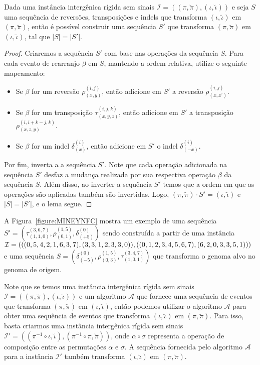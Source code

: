 \begin{lemma}\label{lemma:UWWIFTBQ}
Dada uma instância intergênica rígida sem sinais $\mathcal{I}=((\pi,\breve\pi),(\iota,\breve\iota))$ e seja $S$ uma sequência de reversões, transposições e indels que transforma $(\iota,\breve\iota)$ em $(\pi,\breve\pi)$, então é possível construir uma sequência $S'$ que transforma $(\pi,\breve\pi)$ em $(\iota,\breve\iota)$, tal que $|S| = |S'|$.
\end{lemma}
\begin{proof}
Criaremos a sequência $S'$ com base nas operações da sequência $S$. Para cada evento de rearranjo $\beta$ em $S$, mantendo a ordem relativa, utilize o seguinte mapeamento:
\begin{itemize}
  \item Se $\beta$ for um reversão $\rho^{(i,j)}_{(x,y)}$, então adicione em $S'$ a reversão $\rho^{(i,j)}_{(x,x^{\prime})}$.
  \item Se $\beta$ for um transposição $\tau^{(i,j,k)}_{(x,y,z)}$, então adicione em $S'$ a transposição $\rho^{(i,i+k-j,k)}_{(x,z,y)}$.
  \item Se $\beta$ for um indel $\delta^{(i)}_{(x)}$, então adicione em $S'$ o indel $\delta^{(i)}_{(-x)}$. 
\end{itemize}  
Por fim, inverta a a sequência $S'$. Note que cada operação adicionada na sequência $S'$ desfaz a mudança realizada por sua respectiva operação $\beta$ da sequência $S$. Além disso, ao inverter a sequência $S'$ temos que a ordem em que as operações são aplicadas também são invertidas. Logo, $(\pi,\breve\pi) \cdot S' = (\iota,\breve\iota)$ e $|S| = |S'|$, e o lema segue.
\end{proof}

A Figura~\ref{figure:MINEYNFC} mostra um exemplo de uma sequência $S'=(\tau^{(3,6,7)}_{(1,1,0)},\rho^{(1,5)}_{(0,1)},\delta^{(0)}_{({+5})})$ sendo construída a partir de uma instância $\mathcal{I} = (((0,5,4,2,1,6,3,7),(3,3,1,2,3,3,0)),((0,1,2,\break3,4,5,6,7),(6,2,0,3,3,5,1)))$ e uma sequência $S=(\delta^{(0)}_{({-5})},\rho^{(1,5)}_{(0,3)},\tau^{(3,4,7)}_{(1,0,1)})$ que transforma o genoma alvo no genoma de origem.



\begin{remark}\label{remark:MSXQJZFR}
Note que se temos uma instância intergênica rígida sem sinais $\mathcal{I}=((\pi,\breve\pi),(\iota,\breve\iota))$ e um algoritmo $\mathcal{A}$ que fornece uma sequência de eventos que transforma $(\pi,\breve\pi)$ em $(\iota,\breve\iota)$, então podemos utilizar o algoritmo $\mathcal{A}$ para obter uma sequência de eventos que transforma $(\iota,\breve\iota)$ em $(\pi,\breve\pi)$. Para isso, basta criarmos uma instância intergênica rígida sem sinais $\mathcal{I'}=((\pi^{-1} \circ \iota,\breve\iota),(\pi^{-1} \circ \pi,\breve\pi))$, onde $\alpha \circ \sigma$ representa a operação de composição entre as permutações $\alpha$ e $\sigma$. A sequência fornecida pelo algoritmo $\mathcal{A}$ para a instância $\mathcal{I'}$ também transforma $(\iota,\breve\iota)$ em $(\pi,\breve\pi)$.
\end{remark}

